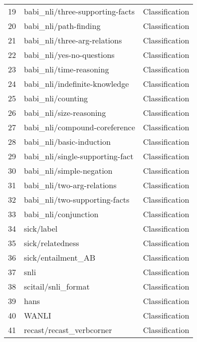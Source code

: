 \documentclass[11pt]{article}
\begin{document}
\begin{longtable}{lll}
19 & babi\_nli/three-supporting-facts \citep{weston2015towards} & Classification \\
20 & babi\_nli/path-finding \citep{weston2015towards} & Classification \\
21 & babi\_nli/three-arg-relations \citep{weston2015towards} & Classification \\
22 & babi\_nli/yes-no-questions \citep{weston2015towards} & Classification \\
23 & babi\_nli/time-reasoning \citep{weston2015towards} & Classification \\
24 & babi\_nli/indefinite-knowledge \citep{weston2015towards} & Classification \\
25 & babi\_nli/counting \citep{weston2015towards} & Classification \\
26 & babi\_nli/size-reasoning \citep{weston2015towards} & Classification \\
27 & babi\_nli/compound-coreference \citep{weston2015towards} & Classification \\
28 & babi\_nli/basic-induction \citep{weston2015towards} & Classification \\
29 & babi\_nli/single-supporting-fact \citep{weston2015towards} & Classification \\
30 & babi\_nli/simple-negation \citep{weston2015towards} & Classification \\
31 & babi\_nli/two-arg-relations \citep{weston2015towards} & Classification \\
32 & babi\_nli/two-supporting-facts \citep{weston2015towards} & Classification \\
33 & babi\_nli/conjunction \citep{weston2015towards} & Classification \\
34 & sick/label \citep{marelli-etal-2014-sick} & Classification \\
35 & sick/relatedness \citep{marelli-etal-2014-sick} & Classification \\
36 & sick/entailment\_AB \citep{marelli-etal-2014-sick} & Classification \\
37 & snli \citep{snli:emnlp2015} & Classification \\
38 & scitail/snli\_format \citep{scitail} & Classification \\
39 & hans \citep{DBLP:journals/corr/abs-1902-01007} & Classification \\
40 & WANLI \citep{liu-etal-2022-wanli} & Classification \\
41 & recast/recast\_verbcorner \citep{poliak-etal-2018-collecting} & Classification \\

\end{longtable}
\end{document}
